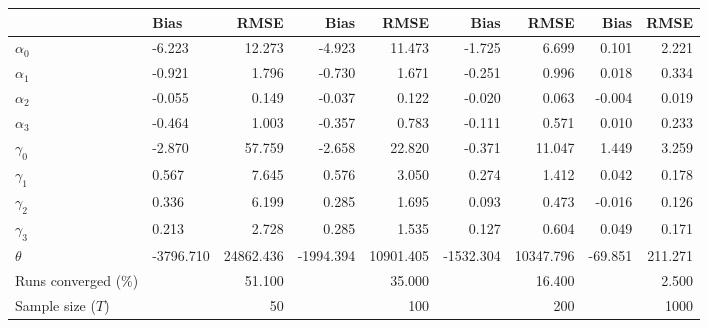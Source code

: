 
\begin{tabular}[t]{llrrrrrrr}
\toprule
  & Bias & RMSE & Bias & RMSE & Bias & RMSE & Bias & RMSE\\
\midrule
$\alpha_{0}$ & -6.223 & 12.273 & -4.923 & 11.473 & -1.725 & 6.699 & 0.101 & 2.221\\
$\alpha_{1}$ & -0.921 & 1.796 & -0.730 & 1.671 & -0.251 & 0.996 & 0.018 & 0.334\\
$\alpha_{2}$ & -0.055 & 0.149 & -0.037 & 0.122 & -0.020 & 0.063 & -0.004 & 0.019\\
$\alpha_{3}$ & -0.464 & 1.003 & -0.357 & 0.783 & -0.111 & 0.571 & 0.010 & 0.233\\
$\gamma_{0}$ & -2.870 & 57.759 & -2.658 & 22.820 & -0.371 & 11.047 & 1.449 & 3.259\\
$\gamma_{1}$ & 0.567 & 7.645 & 0.576 & 3.050 & 0.274 & 1.412 & 0.042 & 0.178\\
$\gamma_{2}$ & 0.336 & 6.199 & 0.285 & 1.695 & 0.093 & 0.473 & -0.016 & 0.126\\
$\gamma_{3}$ & 0.213 & 2.728 & 0.285 & 1.535 & 0.127 & 0.604 & 0.049 & 0.171\\
$\theta$ & -3796.710 & 24862.436 & -1994.394 & 10901.405 & -1532.304 & 10347.796 & -69.851 & 211.271\\
Runs converged (\%) &  & 51.100 &  & 35.000 &  & 16.400 &  & 2.500\\
Sample size ($T$) &  & 50 &  & 100 &  & 200 &  & 1000\\
\bottomrule
\end{tabular}
